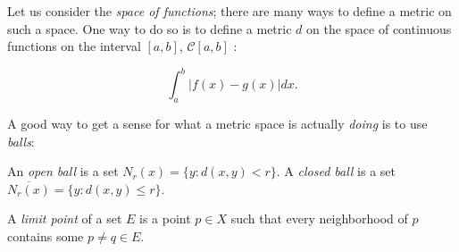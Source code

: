 \begin{eg}
	Let us consider the \emph{space of functions}; there are many ways to define a metric on such a space. One way to do so is to define a metric $d$ on the space of continuous functions on the interval $[a,b]$, $\mathcal{C}[a,b]$ :

    $$\int^b_a |f(x)-g(x)|dx.$$
    
\end{eg}

A good way to get a sense for what a metric space is actually \emph{doing} is to use \emph{balls}:

\begin{definition}
	An \emph{open ball} is a set $N_r(x)=\{y:d(x,y)< r\}$. A \emph{closed ball} is a set $\overline{N_r(x)}=\{y:d(x,y)\leq r\}$.
\end{definition}

\begin{definition}
	A \emph{limit point} of a set $E$ is a point $p\in X$ such that every neighborhood of $p$ contains some $p\neq q\in E$.
\end{definition}